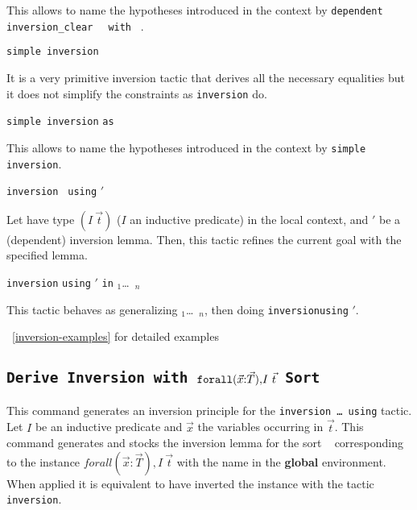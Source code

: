 \begin{Variants}
  This allows to name the hypotheses introduced in the context by
  \texttt{dependent inversion\_clear } {\ident} \texttt{ with } \term.

\item {} \texttt{simple inversion} {\ident}
  
  It is a very primitive inversion tactic that derives all the necessary
  equalities  but it does not simplify the  constraints as
  \texttt{inversion} do.

\item {} \texttt{simple inversion}
  {\ident} \texttt{as} {\intropattern} 
  
  This allows to name the hypotheses introduced in the context by
  \texttt{simple inversion}.

\item {} \texttt{inversion} \ident
  \texttt{ using} \ident$'$  
  
  Let {\ident} have type $(I~\vec{t})$ ($I$ an inductive
  predicate) in the local context, and \ident$'$ be a (dependent) inversion
  lemma. Then, this tactic refines the current goal with the specified
  lemma.

\item {} \texttt{inversion}
  {\ident} \texttt{using} \ident$'$ \texttt{in} \ident$_1$\dots\ \ident$_n$
  
  This tactic behaves as generalizing \ident$_1$\dots\ \ident$_n$,
  then doing \texttt{inversion}{\ident}\texttt{using} \ident$'$.

\end{Variants}

\SeeAlso~\ref{inversion-examples} for detailed examples

\subsection{\tt Derive Inversion {\ident} with
  ${\tt forall (}\vec{x}{\tt :}\vec{T}{\tt),} I~\vec{t}$ Sort \sort
\label{Derive-Inversion}
}

This command generates an inversion principle for the
\texttt{inversion \dots\ using} tactic.
Let $I$ be an inductive predicate and $\vec{x}$ the variables
occurring in $\vec{t}$. This command generates and stocks the
inversion lemma for the sort \sort~ corresponding to the instance
$forall (\vec{x}:\vec{T}), I~\vec{t}$ with the name {\ident} in the {\bf
global} environment. When applied it is equivalent to have inverted
the instance with the tactic {\tt inversion}.

